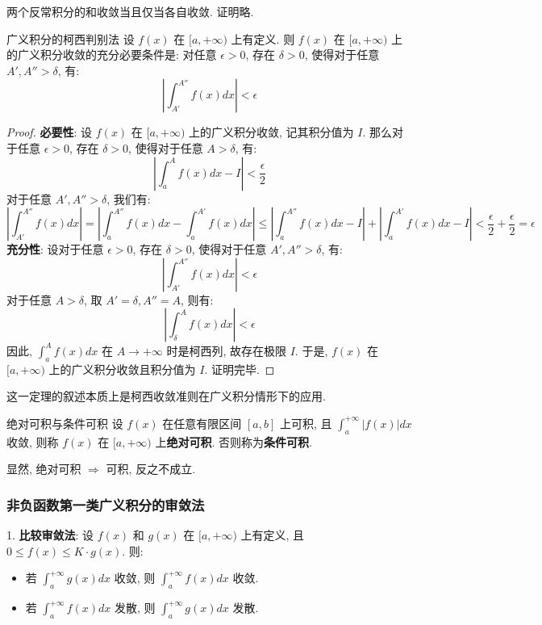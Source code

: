 \documentclass[a4paper,12pt]{ctexart}
\begin{document}
\begin{mythm}{}{}
两个反常积分的和收敛当且仅当各自收敛. 证明略.
\end{mythm}

\begin{mythm}{广义积分的柯西判别法}{}
设 $f(x)$ 在 $[a, +\infty)$ 上有定义. 则 $f(x)$ 在 $[a, +\infty)$ 上的广义积分收敛的充分必要条件是: 对任意 $\epsilon > 0$, 存在 $\delta > 0$, 使得对于任意 $A', A'' > \delta$, 有:
$$
\left| \int_{A'}^{A''} f(x) dx \right| < \epsilon
$$
\end{mythm}

\begin{proof}
\textbf{必要性}: 设 $f(x)$ 在 $[a, +\infty)$ 上的广义积分收敛, 记其积分值为 $I$. 那么对于任意 $\epsilon > 0$, 存在 $\delta > 0$, 使得对于任意 $A > \delta$, 有:
$$
\left| \int_a^A f(x) dx - I \right| < \frac{\epsilon}{2}
$$
对于任意 $A', A'' > \delta$, 我们有:
$$
\left| \int_{A'}^{A''} f(x) dx \right| = \left| \int_a^{A''} f(x) dx - \int_a^{A'} f(x) dx \right| \leq \left| \int_a^{A''} f(x) dx - I \right| + \left| \int_a^{A'} f(x) dx - I \right| < \frac{\epsilon}{2} + \frac{\epsilon}{2} = \epsilon
$$
\textbf{充分性}: 设对于任意 $\epsilon > 0$, 存在 $\delta > 0$, 使得对于任意 $A', A'' > \delta$, 有:
$$
\left| \int_{A'}^{A''} f(x) dx \right| < \epsilon
$$
对于任意 $A > \delta$, 取 $A' = \delta, A'' = A$, 则有:
$$
\left| \int_{\delta}^{A} f(x) dx \right| < \epsilon
$$
因此, $\int_a^A f(x) dx$ 在 $A \to +\infty$ 时是柯西列, 故存在极限 $I$. 于是, $f(x)$ 在 $[a, +\infty)$ 上的广义积分收敛且积分值为 $I$. 证明完毕.
\end{proof}
这一定理的叙述本质上是柯西收敛准则在广义积分情形下的应用.

\begin{mydef}{绝对可积与条件可积}{}
设 $f(x)$ 在任意有限区间 $[a,b]$ 上可积, 且 $\int_a^{+\infty} |f(x)|dx$ 收敛, 则称 $f(x)$ 在 $[a,+\infty)$ 上\textbf{绝对可积}. 否则称为\textbf{条件可积}.
\end{mydef}
显然, 绝对可积 $\Rightarrow$ 可积, 反之不成立.

\subsubsection{非负函数第一类广义积分的审敛法}

1. \textbf{比较审敛法}: 设 $f(x)$ 和 $g(x)$ 在 $[a,+\infty)$ 上有定义, 且 $0 \le f(x) \le K \cdot g(x)$. 则:
\begin{itemize}
    \item 若 $\int_a^{+\infty} g(x) dx$ 收敛, 则 $\int_a^{+\infty} f(x) dx$ 收敛.
    \item 若 $\int_a^{+\infty} f(x) dx$ 发散, 则 $\int_a^{+\infty} g(x) dx$ 发散.
\end{itemize}
\end{document}
